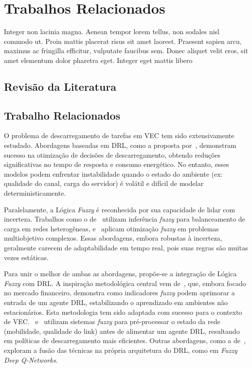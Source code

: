 \chapter{Trabalhos Relacionados}
\label{cap:trabalhos-relacionados}

Integer non lacinia magna. Aenean tempor lorem tellus, non sodales nisl commodo ut. Proin mattis placerat risus sit amet laoreet. Praesent sapien arcu, maximus ac fringilla efficitur, vulputate faucibus sem. Donec aliquet velit eros, sit amet elementum dolor pharetra eget. Integer eget mattis libero

\section{Revisão da Literatura}
\label{sec:revisao-literatura}

\section{Trabalho Relacionados}
\label{sec:trabalho-relacionado-a}

O problema de descarregamento de tarefas em \gls{VEC} tem sido extensivamente estudado. Abordagens baseadas em \gls{DRL}, como a proposta por~, demonstram sucesso na otimização de decisões de descarregamento, obtendo reduções significativas no tempo de resposta e consumo energético. No entanto, esses modelos podem enfrentar instabilidade quando o estado do ambiente (ex: qualidade do canal, carga do servidor) é volátil e difícil de modelar deterministicamente.

Paralelamente, a Lógica \textit{\textit{Fuzzy}} é reconhecida por sua capacidade de lidar com incerteza. Trabalhos como o de~ utilizam inferência \textit{\textit{fuzzy}} para balanceamento de carga em redes heterogêneas, e~ aplicam otimização \textit{\textit{fuzzy}} em problemas multiobjetivo complexos. Essas abordagens, embora robustas à incerteza, geralmente carecem de adaptabilidade em tempo real, pois suas regras são muitas vezes estáticas.

Para unir o melhor de ambas as abordagens, propõe-se a integração de Lógica \textit{\textit{Fuzzy}} com \gls{DRL}. A inspiração metodológica central vem de~, que, embora focado no mercado financeiro, demonstra como indicadores \textit{\textit{fuzzy}} podem aprimorar a entrada de um agente \gls{DRL}, estabilizando o aprendizado em ambientes não estacionários. Esta metodologia tem sido adaptada com sucesso para o contexto de \gls{VEC}.~ e~ utilizam sistemas \textit{\textit{fuzzy}} para pré-processar o estado da rede (mobilidade, qualidade do link) antes de alimentar um agente \gls{DRL}, resultando em políticas de descarregamento mais eficientes. Outras abordagens, como a de~, exploram a fusão das técnicas na própria arquitetura do \gls{DRL}, como em \textit{Fuzzy Deep Q-Networks}.

